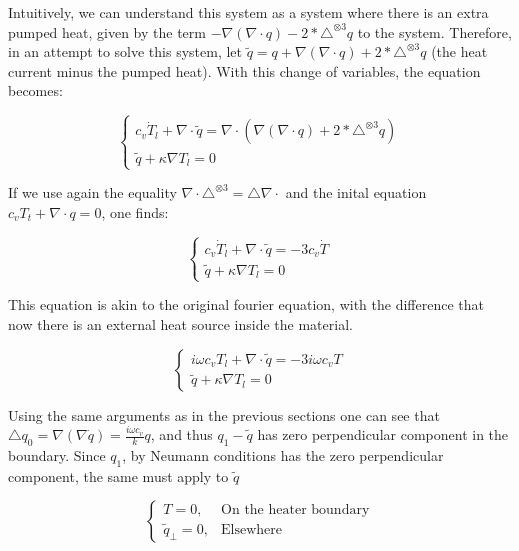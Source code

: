 \documentclass[a4paper, 11pt]{article}
\begin{document}
Intuitively, we can understand this system as a system where there is an extra pumped heat, given by the term $-\nabla(\nabla \cdot q) - 2*\triangle^{\otimes 3} q$ to the system. Therefore, in an attempt to solve this system, let $\tilde q =q + \nabla(\nabla \cdot q) + 2*\triangle^{\otimes 3} q$ (the heat current minus the pumped heat). With this change of variables, the equation becomes:


\begin{equation}
	\label{eq:hydrodinamic_pde_derivative_tilde}
	\begin{cases}
		{c_v \dot T_l + \nabla \cdot \tilde q = \nabla \cdot(\nabla(\nabla \cdot q) + 2*\triangle^{\otimes 3} q) } \\
		{\tilde q +\kappa \nabla T_l  = 0}
	\end{cases}
\end{equation}

If we use again the equality $\nabla \cdot \triangle^{\otimes 3} = \triangle \nabla \cdot {}$ and the inital equation ${c_v T_t + \nabla \cdot q =0}$, one finds:

\begin{equation}
	\label{eq:hydrodinamic_pde_derivative_tilde_2}
	\begin{cases}
		{c_v \dot T_l + \nabla \cdot \tilde q = -3 c_v \dot T} \\
		{\tilde q +\kappa \nabla T_l  = 0}
	\end{cases}
\end{equation}

This equation is akin to the original fourier equation, with the difference that now there is an external heat source inside the material.


\begin{equation}
	\label{eq:hydrodinamic_pde_derivative_tilde_2}
	\begin{cases}
		{ i \omega c_v  T_l + \nabla \cdot \tilde q = -3 i \omega c_v  T} \\
		{\tilde q +\kappa \nabla T_l  = 0}
	\end{cases}
\end{equation}

Using the same arguments as in the previous sections one can see that $\triangle q_0 = \nabla(\nabla\dot q) = \frac{i \omega c_v}{k} q$, and thus $q_1-\tilde q$ has zero perpendicular component in the boundary. Since $q_1$, by Neumann conditions has the zero perpendicular component, the same must apply to $\tilde q$

\begin{equation}
	\begin{cases}
		T = 0, & \text{On the heater boundary}\\
		\tilde q_\bot = 0 , & \text{Elsewhere}                     
	\end{cases}
\end{equation}
\end{document}
